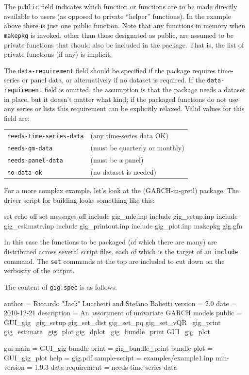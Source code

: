 The \texttt{public} field indicates which function or functions are to
be made directly available to users (as opposed to private ``helper''
functions).  In the example above there is just one public
function. Note that any functions in memory when \texttt{makepkg} is
invoked, other than those designated as public, are assumed to be
private functions that should also be included in the package. That
is, the list of private functions (if any) is implicit.

The \texttt{data-requirement} field should be specified if the package
requires time-series or panel data, or alternatively if no dataset is
required.  If the \texttt{data-requirement} field is omitted, the
assumption is that the package needs a dataset in place, but it
doesn't matter what kind; if the packaged functions do not use any
series or lists this requirement can be explicitly relaxed.  Valid
values for this field are:

\begin{center}
\begin{tabular}{ll}
\texttt{needs-time-series-data} & (any time-series data OK) \\ 
\texttt{needs-qm-data} & (must be quarterly or monthly) \\ 
\texttt{needs-panel-data} & (must be a panel) \\
\texttt{no-data-ok} & (no dataset is needed) \\
\end{tabular}
\end{center}

For a more complex example, let's look at the 
(GARCH-in-gretl) package.  The driver script for building 
looks something like this:
%
\begin{code}
set echo off
set messages off
include gig_mle.inp
include gig_setup.inp
include gig_estimate.inp
include gig_printout.inp
include gig_plot.inp
makepkg gig.gfn
\end{code}

In this case the functions to be packaged (of which there are many)
are distributed across several script files, each of which is the
target of an \texttt{include} command.  The \texttt{set} commands at
the top are included to cut down on the verbosity of the output.

The content of \texttt{gig.spec} is as follows:
%
\begin{code}
author = Riccardo "Jack" Lucchetti and Stefano Balietti
version = 2.0
date = 2010-12-21
description = An assortment of univariate GARCH models
public = GUI_gig \
    gig_setup gig_set_dist gig_set_pq gig_set_vQR \
    gig_print gig_estimate \
    gig_plot gig_dplot \
    gig_bundle_print GUI_gig_plot

gui-main = GUI_gig
bundle-print = gig_bundle_print
bundle-plot = GUI_gig_plot
help = gig.pdf
sample-script = examples/example1.inp
min-version = 1.9.3
data-requirement = needs-time-series-data
\end{code}

